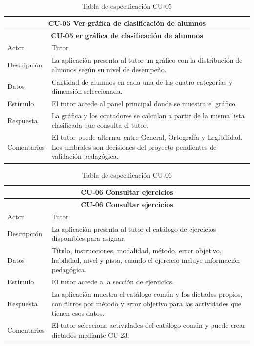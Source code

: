 \begin{longtable}{|p{4cm}|p{11cm}|}
\caption{Tabla de especificación CU-05}
\label{tab:cu05} \\

\hline
\multicolumn{2}{|c|}{\textbf{CU-05 Ver gráfica de clasificación de alumnos}} \\
\hline
\endfirsthead

\hline
\multicolumn{2}{|c|}{\textbf{CU-05 er gráfica de clasificación de alumnos}} \\
\hline
\endhead

\hline
\endfoot
\endlastfoot

Actor & Tutor \\
\hline
Descripción & La aplicación presenta al tutor un gráfico con la distribución de alumnos según su nivel de desempeño. \\
\hline
Datos & Cantidad de alumnos en cada una de las cuatro categorías y dimensión seleccionada. \\
\hline
Estímulo & El tutor accede al panel principal donde se muestra el gráfico. \\
\hline
Respuesta & La gráfica y los contadores se calculan a partir de la misma lista clasificada que consulta el tutor. \\
\hline
Comentarios & El tutor puede alternar entre General, Ortografía y Legibilidad. Los umbrales son decisiones del proyecto pendientes de validación pedagógica. \\
\hline

\end{longtable}


\begin{longtable}{|p{4cm}|p{11cm}|}
\caption{Tabla de especificación CU-06}
\label{tab:cu06} \\

\hline
\multicolumn{2}{|c|}{\textbf{CU-06 Consultar ejercicios}} \\
\hline
\endfirsthead

\hline
\multicolumn{2}{|c|}{\textbf{CU-06 Consultar ejercicios}} \\
\hline
\endhead

\hline
\endfoot
\endlastfoot

Actor & Tutor \\
\hline
Descripción & La aplicación presenta al tutor el catálogo de ejercicios disponibles para asignar. \\
\hline
Datos & Título, instrucciones, modalidad, método, error objetivo, habilidad, nivel y pista, cuando el ejercicio incluye información pedagógica. \\
\hline
Estímulo & El tutor accede a la sección de ejercicios. \\
\hline
Respuesta & La aplicación muestra el catálogo común y los dictados propios, con filtros por método y error objetivo para las actividades que tienen esos datos. \\
\hline
Comentarios & El tutor selecciona actividades del catálogo común y puede crear dictados mediante CU-23. \\
\hline

\end{longtable}

